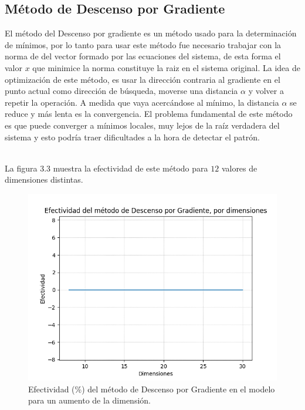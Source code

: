 \subsection{M\'etodo de Descenso por Gradiente}

\par El m\'etodo del Descenso por gradiente es un m\'etodo usado para la determinaci\'on de m\'inimos, por lo tanto para usar este m\'etodo fue necesario trabajar con la norma de del vector formado por las ecuaciones del sistema, de esta forma el valor $x$ que minimice la norma constituye la raiz en el sistema original. La idea de optimizaci\'on de este m\'etodo, es usar la direcci\'on contraria al gradiente en el punto actual como direcci\'on de b\'usqueda, moverse una distancia $\alpha$ y volver a repetir la operaci\'on. A medida que vaya acerc\'andose al m\'inimo, la distancia $\alpha$ se reduce y m\'as lenta es la convergencia. El problema fundamental de este m\'etodo es que puede converger a m\'inimos locales, muy lejos de la ra\'iz verdadera del sistema y esto podr\'ia traer dificultades a la hora de detectar el patr\'on.\\\

\par La figura 3.3 muestra la efectividad de este m\'etodo para $12$ valores de dimensiones distintas.\\

\begin{figure}[h]
\center
\includegraphics[scale=.45]{Graphics/DescensoGradiente.png}
\caption{Efectividad (\%) del m\'etodo de Descenso por Gradiente en el modelo para un aumento de la dimensi\'on.}
\end{figure}

